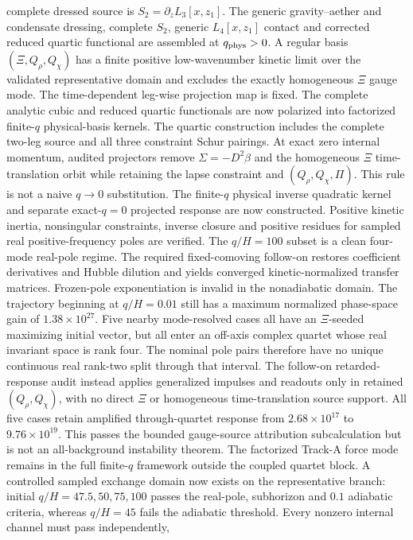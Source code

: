 complete dressed source is $S_2=\partial_zL_3[x,z_1]$.  The generic
gravity--aether and condensate dressing, complete $S_2$, generic
$L_4[x,z_1]$ contact and corrected reduced quartic functional are assembled
at $q_{\rm phys}>0$.  A regular basis $(\Xi,Q_\rho,Q_\chi)$ has a finite
positive low-wavenumber kinetic limit over the validated representative
domain and excludes the exactly homogeneous $\Xi$ gauge mode.  The
time-dependent leg-wise projection map is fixed.  The complete analytic cubic
and reduced quartic functionals are now polarized into factorized finite-$q$
physical-basis kernels.  The quartic construction
includes the complete two-leg source and all three constraint Schur pairings.
At exact zero internal momentum, audited projectors remove
$\Sigma=-D^2\beta$ and the homogeneous $\Xi$ time-translation orbit while
retaining the lapse constraint and $(Q_\rho,Q_\chi,\Pi)$.  This rule is not a
naive $q\to0$ substitution.  The finite-$q$ physical inverse quadratic kernel
and separate exact-$q=0$ projected response are now constructed.  Positive
kinetic inertia, nonsingular constraints, inverse closure and positive
residues for sampled real positive-frequency poles are verified.  The
$q/H=100$ subset is a clean four-mode real-pole regime.  The required
fixed-comoving follow-on restores coefficient derivatives and Hubble dilution
and yields converged kinetic-normalized transfer matrices.  Frozen-pole
exponentiation is invalid in the nonadiabatic domain.  The trajectory beginning
at $q/H=0.01$ still has a maximum normalized phase-space gain of
$1.38\times10^{27}$.  Five nearby mode-resolved cases all have an
$\Xi$-seeded maximizing initial vector, but all enter an off-axis complex
quartet whose real invariant space is rank four.  The nominal pole pairs
therefore have no unique continuous real rank-two split through that interval.
The follow-on retarded-response audit instead applies generalized impulses and
readouts only in retained $(Q_\rho,Q_\chi)$, with no direct $\Xi$ or
homogeneous time-translation source support.  All five cases retain amplified
through-quartet response from $2.68\times10^{17}$ to
$9.76\times10^{19}$.  This passes the bounded gauge-source attribution
subcalculation but is not an all-background instability theorem.  The
factorized Track-A force mode remains in the full finite-$q$ framework outside
the coupled quartet block.  A controlled sampled exchange domain now exists
on the representative branch: initial $q/H=47.5,50,75,100$ passes the
real-pole, subhorizon and $0.1$ adiabatic criteria, whereas $q/H=45$ fails the
adiabatic threshold.  Every nonzero internal channel must pass independently,
